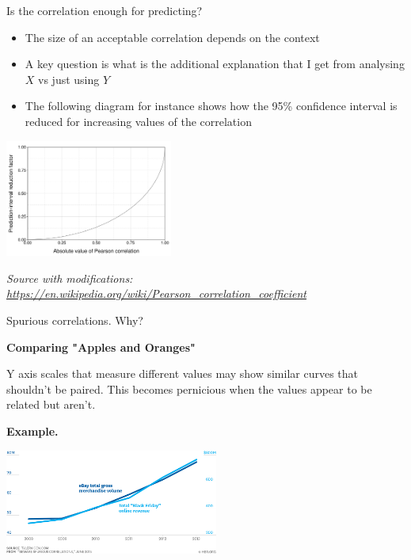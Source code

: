 \documentclass{beamer}
\begin{document}
\begin{frame}
{\centerline{Is the correlation enough for predicting?}}

\begin{itemize}
\item The size of an acceptable correlation depends on the context
\item A key question is what is the additional explanation that I get from analysing $X$ vs just using $Y$
\item The following diagram for instance shows how the 95\% confidence interval is reduced for increasing values of the correlation
\end{itemize}
\vspace*{-0.5cm}
\begin{center}
\includegraphics[width=5.5cm]{P2023.AIBCCSS.InferenceAndLogisticRegression/956px-Pearson_correlation_and_prediction_intervals.png}
\end{center} 
\vspace*{-0.5cm}
\textit{\tiny
\vspace{-\baselineskip}
Source with modifications: \url{https://en.wikipedia.org/wiki/Pearson_correlation_coefficient}}

\end{frame}


\begin{frame}
{\centerline{Spurious correlations. Why?}}


\textbf{Comparing "Apples and Oranges"}

Y axis scales that measure different values may show similar curves that shouldn’t be paired. This becomes pernicious when the values appear to be related but aren’t.

\textbf{Example. }

\begin{center}
\includegraphics[width=7cm]{P2023.AIBCCSS.InferenceAndLogisticRegression/F1506Z_VS_BEWARESPURIOUSCORRELATIONS-2.png}
\end{center}

\end{frame}
\end{document}
